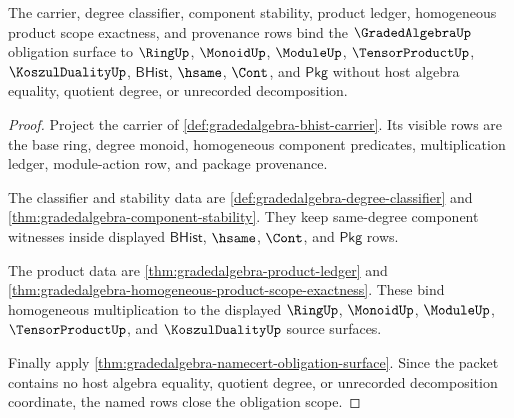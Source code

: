 \begin{theorem}
\label{thm:gradedalgebra-obligation-scope-certificate}
The carrier, degree classifier, component stability, product ledger,
homogeneous product scope exactness, and provenance rows bind the
$\GradedAlgebraUp$ obligation surface to $\RingUp$, $\MonoidUp$, $\ModuleUp$,
$\TensorProductUp$, $\KoszulDualityUp$, $\mathsf{BHist}$, $\hsame$, $\Cont$,
and $\mathsf{Pkg}$ without host algebra equality, quotient degree, or
unrecorded decomposition.
\end{theorem}
\begin{proof}
Project the carrier of \autoref{def:gradedalgebra-bhist-carrier}. Its visible
rows are the base ring, degree monoid, homogeneous component predicates,
multiplication ledger, module-action row, and package provenance.

The classifier and stability data are
\autoref{def:gradedalgebra-degree-classifier} and
\autoref{thm:gradedalgebra-component-stability}. They keep same-degree
component witnesses inside displayed $\mathsf{BHist}$, $\hsame$, $\Cont$, and
$\mathsf{Pkg}$ rows.

The product data are \autoref{thm:gradedalgebra-product-ledger} and
\autoref{thm:gradedalgebra-homogeneous-product-scope-exactness}. These bind
homogeneous multiplication to the displayed $\RingUp$, $\MonoidUp$,
$\ModuleUp$, $\TensorProductUp$, and $\KoszulDualityUp$ source surfaces.

Finally apply \autoref{thm:gradedalgebra-namecert-obligation-surface}. Since
the packet contains no host algebra equality, quotient degree, or unrecorded
decomposition coordinate, the named rows close the obligation scope.
\end{proof}

